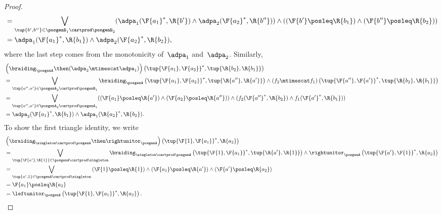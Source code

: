 \begin{proof}
\begin{equation}
\begin{aligned}
            &=\bigvee_{\tup{b',b''}\in \posgenB_1\cartprod \posgenB_2}(\adpa_1(\F{a_1}^*,\R{b'})\wedge \adpa_2(\F{a_2}^*,\R{b''}))\wedge (\left(\F{b'}\posleq \R{b_1}\right) \wedge \left(\F{b''}\posleq \R{b_2}\right))\\
            &= \adpa_1(\F{a_1}^*,\R{b_1}) \wedge \adpa_2(\F{a_2}^*,\R{b_2}),
        \end{aligned}
    \end{equation}
    where the last step comes from the monotonicity of~$\adpa_1$ and~$\adpa_2$.
    Similarly,
    \begin{equation}
        \begin{aligned}
            &\left( \braiding_\posgenA \then (\adpa_2\mtimescat \adpa_1)\right)\left( \tup{\F{a_1},\F{a_2}}^*,\tup{\R{b_2},\R{b_1}}\right)\\
            &=\bigvee_{\tup{a'',a'}\in \posgenA_2\cartprod \posgenB_1}\braiding_\posgenA\left(\tup{\F{a_1},\F{a_2}}^*,\tup{\R{a''},\R{a'}} \right)\wedge \left(f_2\mtimescat f_1\right) \left( \tup{\F{a''},\F{a'}}^*,\tup{\R{b_2},\R{b_1}}\right)\\
            &=\bigvee_{\tup{a'',a'}\in \posgenA_2\cartprod \posgenA_1}(\left(\F{a_1}\posleq \R{a'}\right)\wedge \left(\F{a_2}\posleq \R{a''}\right)) \wedge (f_2(\F{a''}^*,\R{b_2})\wedge f_1(\F{a'}^*,\R{b_1}))\\
            &= \adpa_2(\F{a_1}^*,\R{b_1}) \wedge \adpa_1(\R{a_2}^*,\R{b_2}).
        \end{aligned}
    \end{equation}
    To show the first triangle identity, we write
    \begin{equation}
        \begin{aligned}
            &\left(\braiding_{\singleton \cartprod \posgenA}\then \rightunitor_\posgenA\right)\left( \tup{\F{1},\F{a_1}}^*,\R{a_2}\right)\\
            &=\bigvee_{\tup{\F{a'},\R{1}}\in \posgenA\cartprod \singleton}\braiding_{\singleton \cartprod \posgenA}\left( \tup{\F{1},\F{a_1}}^*,\tup{\R{a'},\R{1}}\right)\wedge \rightunitor_\posgenA\left( \tup{\F{a'},\F{1}}^*,\R{a_2}\right)\\
            &=\bigvee_{\tup{a',1}\in \posgenA\cartprod \singleton} \left(\F{1}\posleq \R{1}\right) \wedge \left(\F{a_1}\posleq \R{a'}\right)\wedge \left(\F{a'}\posleq \R{a_2}\right)\\
            &=\F{a_1}\posleq \R{a_2}\\
            &=\leftunitor_\posgenA\left( \tup{\F{1},\F{a_1}}^*,\R{a_2}\right).

\end{aligned}
\end{equation}
\end{proof}
